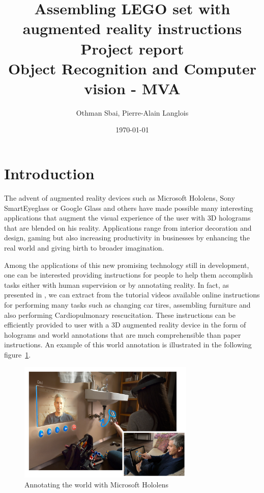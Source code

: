 \documentclass[a4paper,10pt]{article}
\title{%
	\huge{Assembling LEGO set with augmented reality instructions}\\ \bigbreak
  	\Large{Project report}\\ 
  	\Large{Object Recognition and Computer vision - MVA}
}
\author{Othman Sbai, Pierre-Alain Langlois}
\date\today
\begin{document}
\maketitle

\section{Introduction}
The advent of augmented reality devices such as Microsoft Hololens, Sony SmartEyeglass or Google Glass and others have made possible many interesting applications that augment the visual experience of the user with 3D holograms that are blended on his reality. Applications range from interior decoration and design, gaming but also increasing productivity in businesses by enhancing the real world and giving birth to broader imagination.

Among the applications of this new promising technology still in development, one can be interested providing instructions for people to help them accomplish tasks either with human supervision or by annotating reality. In fact, as presented in \cite{alayrac_unsupervised_2015}, we can extract from the tutorial videos available online instructions for performing many tasks such as changing car tires, assembling furniture and also performing Cardiopulmonary rescucitation. These instructions can be efficiently provided to user with a 3D augmented reality device in the form of holograms and world annotations that are much comprehensible than paper instructions. An example of this world annotation is illustrated in the following figure~\ref{AnnotatingTheWorld}.


\begin{figure}
    \centering
    \includegraphics[width=0.75\textwidth]{Annotating_world_hololens}
    \caption{Annotating the world with Microsoft Hololens}
    \label{AnnotatingTheWorld}
\end{figure}
\end{document}
